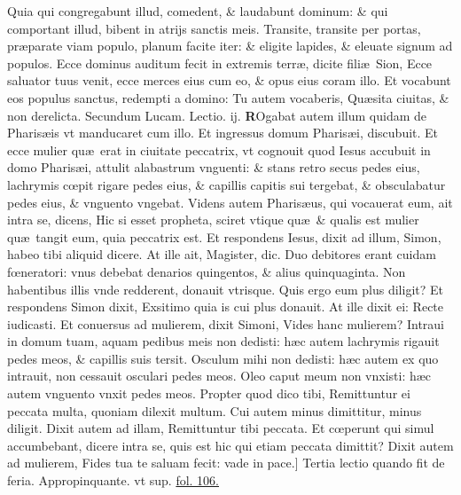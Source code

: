 \documentclass[a5paper,10pt]{book}
\def\leftmarginnote{%
	\lrmarginnote{\hskip -\marginparsep \hskip -6.5em}}
\def\ae{æ}
\def\oe{œ}
\begin{document}
\begin{multicols*}{2}
Quia qui congregabunt illud, comedent, \& laudabunt dominum: \& qui comportant illud, bibent in atrijs sanctis meis.
Transite, transite per portas, pr\ae parate viam populo, planum facite iter: \& eligite lapides, \& eleuate signum ad populos.
Ecce dominus auditum fecit in extremis terr\ae , dicite fili\ae \ Sion, Ecce saluator tuus venit, ecce merces eius cum eo, \& opus eius coram illo.
Et vocabunt eos populus sanctus, redempti a domino: Tu autem vocaberis, Qu\ae sita ciuitas, \& non derelicta.
\fancyhead[C]{\color{red} Feria. iiij. Dominic\ae . iij. aduentus}
\newline \color{red} Secundum Lucam. \hfill Lectio. ij. \color{black}
\vspace{-.25em}
\lettrine[lines=2]{\bfseries \color{red} R}{}\textdagger Ogabat\leftmarginnote{\begin{flushright}c.7.f\end{flushright}} autem illum quidam de Pharis\ae is vt manducaret cum illo.
Et ingressus domum Pharis\ae i, discubuit. Et ecce mulier qu\ae \ erat in ciuitate peccatrix, vt cognouit quod Iesus accubuit in domo Pharis\ae i, attulit alabastrum vnguenti: \& stans retro secus pedes eius, lachrymis c\oe pit rigare pedes eius, \& capillis capitis sui tergebat, \& obsculabatur pedes eius, \& vnguento vngebat.
Videns autem Pharis\ae us, qui vocauerat eum, ait intra se, dicens, Hic si esset propheta, sciret vtique qu\ae \ \& qualis est mulier qu\ae \ tangit eum, quia peccatrix est.
Et respondens Iesus, dixit ad illum, Simon, habeo tibi aliquid dicere. At ille ait, Magister, dic.
Duo debitores erant cuidam f\oe neratori: vnus debebat denarios quingentos, \& 
alius quinquaginta.
Non habentibus illis vnde redderent, donauit vtrisque.
Quis ergo eum plus diligit? Et respondens Simon dixit, Exsitimo quia is cui plus donauit. At ille dixit ei: Recte iudicasti.
Et conuersus ad mulierem, dixit Simoni, Vides hanc mulierem?
Intraui in domum tuam, aquam pedibus meis non dedisti: h\ae c autem lachrymis rigauit pedes meos, \& capillis suis tersit.
Osculum mihi non dedisti: h\ae c autem ex quo intrauit, non cessauit osculari pedes meos.
Oleo caput meum non vnxisti: h\ae c autem vnguento vnxit pedes meos.
Propter quod dico tibi, Remittuntur ei peccata multa, quoniam dilexit multum. Cui autem minus dimittitur, minus diligit.
Dixit autem ad illam, Remittuntur tibi peccata.
Et c\oe perunt qui simul accumbebant, dicere intra se, quis est hic qui etiam peccata dimittit?
Dixit autem ad mulierem, Fides tua te saluam fecit: vade in pace.]
\newline \color{red} Tertia lectio quando fit de feria. \color{black} Appropinquante. \color{red} vt sup. \color{black} \hyperlink{page.106}{fol. 106.}

\end{multicols*}
\end{document}

